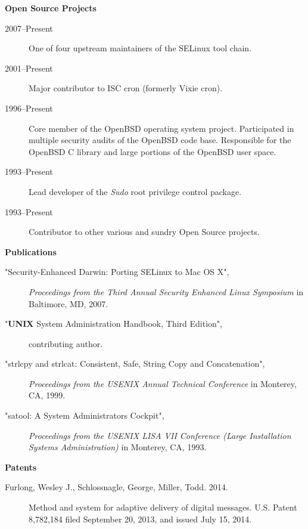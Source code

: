 \documentclass[a4paper,11pt]{article}
\newcommand{\resheading}[1]{{\large \colorbox{mygrey}{\begin{minipage}{\textwidth}{\textbf{#1 \vphantom{p\^{E}}}}\end{minipage}}}}
\begin{document}
\resheading{Open Source Projects}

\begin{description}
\item[2007--Present] One of four upstream maintainers of the SELinux tool chain.
\item[2001--Present] Major contributor to ISC cron (formerly Vixie cron).
\item[1996--Present] Core member of the OpenBSD operating system project.  Participated in multiple security audits of the OpenBSD code base.  Responsible for the OpenBSD C library and large portions of the OpenBSD user space.
\item[1993--Present] Lead developer of the \emph{Sudo} root privilege control package.
\item[1993--Present] Contributor to other various and sundry Open Source projects.
\end{description}

\resheading{Publications}

\begin{description}
\item["Security-Enhanced Darwin: Porting SELinux to Mac OS X",]
\emph{Proceedings from the Third Annual Security Enhanced Linux Symposium} in Baltimore, MD, 2007.
\item["{\sc \bf UNIX} System Administration Handbook, Third Edition",]
contributing author.
\item["strlcpy and strlcat:  Consistent, Safe, String Copy and Concatenation",]
\emph{Proceedings from the USENIX Annual Technical Conference} in Monterey, CA, 1999.
\item["satool:  A System Administrators Cockpit",]
\emph{Proceedings from the USENIX LISA VII Conference (Large Installation Systems Administration)} in Monterey, CA, 1993.
\end{description}

\resheading{Patents}

\begin{description}
\item[Furlong, Wesley J., Schlossnagle, George, Miller, Todd.  2014.]
Method and system for adaptive delivery of digital messages.
U.S. Patent 8,782,184 filed September 20, 2013, and issued July 15, 2014.
\end{description}
\end{document}
